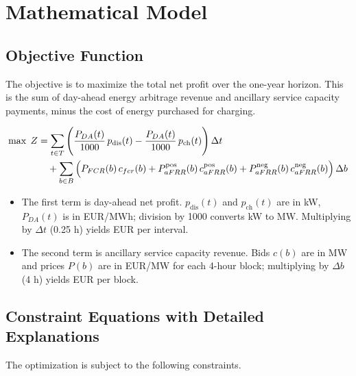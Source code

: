 \section*{Mathematical Model}


\subsection*{Objective Function}

The objective is to maximize the total net profit over the one-year horizon. This is the sum of day-ahead energy arbitrage revenue and ancillary service capacity payments, minus the cost of energy purchased for charging.

\begin{align}
\max\; Z
&= \sum_{t\in T} \Bigg( \frac{P_{DA}(t)}{1000}\, p_{\mathrm{dis}}(t) - \frac{P_{DA}(t)}{1000}\, p_{\mathrm{ch}}(t) \Bigg)\, \Delta t \notag \\
&\quad + \sum_{b\in B} \Big( P_{FCR}(b)\, c_{fcr}(b) + P^{\mathrm{pos}}_{aFRR}(b)\, c^{\mathrm{pos}}_{aFRR}(b) + P^{\mathrm{neg}}_{aFRR}(b)\, c^{\mathrm{neg}}_{aFRR}(b) \Big)\, \Delta b
\end{align}

\begin{itemize}
  \item The first term is day-ahead net profit. $p_{\mathrm{dis}}(t)$ and $p_{\mathrm{ch}}(t)$ are in kW, $P_{DA}(t)$ is in EUR/MWh; division by 1000 converts kW to MW. Multiplying by $\Delta t$ (0.25 h) yields EUR per interval.
  \item The second term is ancillary service capacity revenue. Bids $c(b)$ are in MW and prices $P(b)$ are in EUR/MW for each 4-hour block; multiplying by $\Delta b$ (4 h) yields EUR per block.
\end{itemize}

\subsection*{Constraint Equations with Detailed Explanations}

The optimization is subject to the following constraints.

